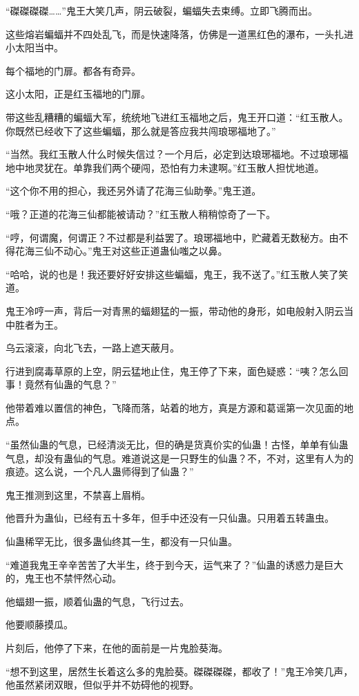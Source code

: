 \begin{this_body}
“磔磔磔磔……”鬼王大笑几声，阴云破裂，蝙蝠失去束缚。立即飞腾而出。

这些熔岩蝙蝠并不四处乱飞，而是快速降落，仿佛是一道黑红色的瀑布，一头扎进小太阳当中。

每个福地的门扉。都各有奇异。

这小太阳，正是红玉福地的门扉。

带这些乱糟糟的蝙蝠大军，统统地飞进红玉福地之后，鬼王开口道：“红玉散人。你既然已经收下了这些蝙蝠，那么就是答应我共闯琅琊福地了。”

“当然。我红玉散人什么时候失信过？一个月后，必定到达琅琊福地。不过琅琊福地中地灵犹在。单靠我们两个硬闯，恐怕有力未逮啊。”红玉散人担忧地道。

“这个你不用的担心，我还另外请了花海三仙助拳。”鬼王道。

“哦？正道的花海三仙都能被请动？”红玉散人稍稍惊奇了一下。

“哼，何谓魔，何谓正？不过都是利益罢了。琅琊福地中，贮藏着无数秘方。由不得花海三仙不动心。”鬼王对这些正道蛊仙嗤之以鼻。

“哈哈，说的也是！我还要好好安排这些蝙蝠，鬼王，我不送了。”红玉散人笑了笑道。

鬼王冷哼一声，背后一对青黑的蝠翅猛的一振，带动他的身形，如电般射入阴云当中胜者为王。

乌云滚滚，向北飞去，一路上遮天蔽月。

行进到腐毒草原的上空，阴云猛地止住，鬼王停了下来，面色疑惑：“咦？怎么回事！竟然有仙蛊的气息？”

他带着难以置信的神色，飞降而落，站着的地方，真是方源和葛谣第一次见面的地点。

“虽然仙蛊的气息，已经清淡无比，但的确是货真价实的仙蛊！古怪，单单有仙蛊气息，却没有蛊仙的气息。难道说这是一只野生的仙蛊？不，不对，这里有人为的痕迹。这么说，一个凡人蛊师得到了仙蛊？”

鬼王推测到这里，不禁喜上眉梢。

他晋升为蛊仙，已经有五十多年，但手中还没有一只仙蛊。只用着五转蛊虫。

仙蛊稀罕无比，很多蛊仙终其一生，都没有一只仙蛊。

“难道我鬼王辛辛苦苦了大半生，终于到今天，运气来了？”仙蛊的诱惑力是巨大的，鬼王也不禁怦然心动。

他蝠翅一振，顺着仙蛊的气息，飞行过去。

他要顺藤摸瓜。

片刻后，他停了下来，在他的面前是一片鬼脸葵海。

“想不到这里，居然生长着这么多的鬼脸葵。磔磔磔磔，都收了！”鬼王冷笑几声，他虽然紧闭双眼，但似乎并不妨碍他的视野。


\end{this_body}
